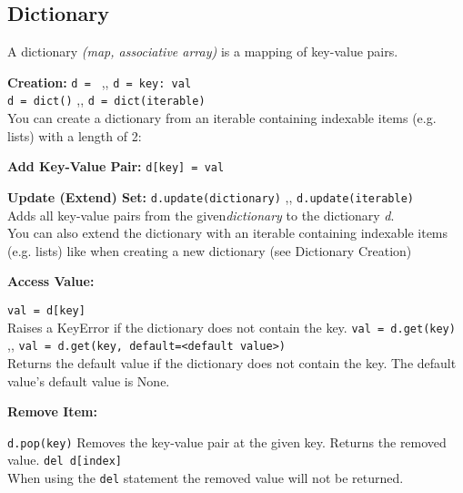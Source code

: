 \subsection{Dictionary}
    A dictionary \textit{(map, associative array)} is a mapping of key-value pairs.

    \begin{indentblock}
        \textbf{Creation:} \texttt{d = {}} \sep{,}
        \texttt{d = {key: val}} \\
        \texttt{d = dict()} \sep{,} \texttt{d = dict(iterable)} \\
        You can create a dictionary from an iterable containing indexable items (e.g. lists)
        with a length of 2:


        \textbf{Add Key-Value Pair:} \texttt{d[key] = val}

        \textbf{Update (Extend) Set:} \texttt{d.update(dictionary)} \sep{,}
        \texttt{d.update(iterable)} \\
        Adds all key-value pairs from the given\textit{dictionary} to the dictionary
        \textit{d}.\\
        You can also extend the dictionary with an iterable containing indexable items
        (e.g. lists) like when creating a new dictionary (see Dictionary Creation)

        \textbf{Access Value:}
        \begin{itemize}
             \texttt{val = d[key]} \\
            Raises a KeyError if the dictionary does not contain the key.
             \texttt{val = d.get(key)} \sep{,}
            \texttt{val = d.get(key, default=<default value>)} \\
            Returns the default value if the dictionary does not contain the key.
            The default value's default value is None.
        \end{itemize}

        \textbf{Remove Item:}
        \begin{itemize}
             \texttt{d.pop(key)}
            Removes the key-value pair at the given key. Returns the removed value.
             \texttt{del d[index]} \\
            When using the \texttt{del} statement the removed value will not be
            returned.
        \end{itemize}


\end{indentblock}
